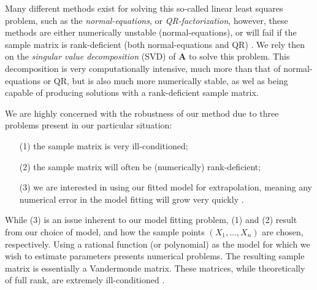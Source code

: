 Many different methods exist for solving this so-called linear least squares problem, 
such as the \textit{normal-equations}, or \textit{QR-factorization}, 
however, these methods are either numerically unstable (normal-equations), or will fail
if the sample matrix is rank-deficient (both normal-equations and QR) 
\cite{corless2013graduate}.
We rely then on the \textit{singular value decomposition} (SVD) of $\mathbf{A}$ 
to solve this problem.
This decomposition is very computationally intensive, much more than that of
normal-equations or QR, but is also much more numerically
stable, as wel as being capable of producing solutions with a rank-deficient sample matrix.

We are highly concerned with the robustness of our
method due to three problems present in our particular situation:
\begin{enumerate}
	\item[(1)] the sample matrix is very ill-conditioned;
	\item[(2)] the sample matrix will often be (numerically) rank-deficient;
	\item[(3)] we are interested in using our fitted model for extrapolation, meaning 
	any numerical error in the model fitting will grow very quickly \cite{corless2013graduate}.
\end{enumerate}
While (3) is an issue inherent to our model fitting problem, (1) and (2) result
from our choice of model, and how the sample points $(X_1,\ldots, X_n)$ are chosen, respectively.
Using a rational function (or polynomial) as the model for which we wish to estimate parameters
presents numerical problems. The resulting sample matrix is essentially 
a Vandermonde matrix. These matrices,
while theoretically of full rank, are extremely ill-conditioned
\cite{corless2013graduate, beckermann2000condition}. 

